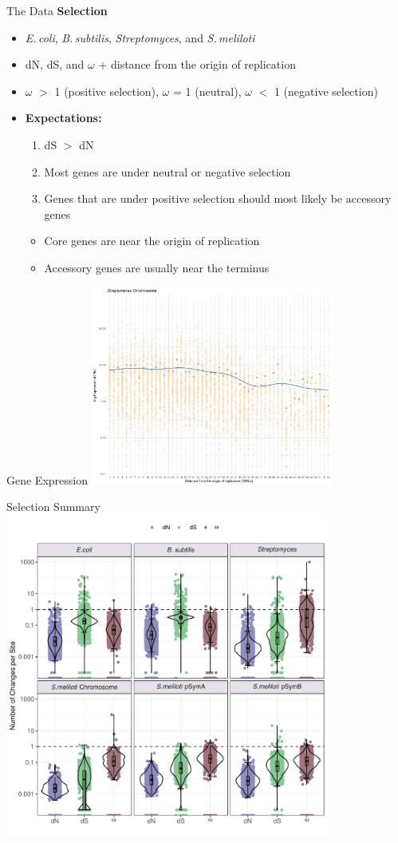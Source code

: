 \documentclass{beamer}
\makeatletter
\newcommand{\bi}{\begin{itemize}}
\newcommand{\ei}{\end{itemize}}
\newcommand{\itm}{\item<itm@1->}
\newcommand{\smel}{\textit{S.\,meliloti}\xspace}
\newcommand{\bass}{\textit{B.\,subtilis}\xspace}
\newcommand{\strep}{\textit{Streptomyces}\xspace}
\newcommand{\ecol}{\textit{E.\,coli}\xspace}
\makeatother
\begin{document}
\begin{frame}[t]{The Data}
			\textbf{Selection}
			\bi
			\itm \ecol, \bass, \strep, and \smel
			\itm dN, dS, and $\omega$ $+$ distance from the origin of replication
			\itm $\omega$ $>$ 1 (positive selection), $\omega$ = 1 (neutral), $\omega$ $<$ 1 (negative selection)
			\itm \textbf{Expectations:} 
			\begin{enumerate}
				\item dS $>$ dN
				\item Most genes are under neutral or negative selection
				\item Genes that are under positive selection should most likely be accessory genes
			\end{enumerate}
			\bi
			\itm Core genes are near the origin of replication
			\itm Accessory genes are usually near the terminus
			\ei
			\ei
\end{frame}
\begin{frame}{Gene Expression}
	\centering
	\includegraphics[width=0.6\textwidth]{strep_expression_plot.pdf}
\end{frame}
\begin{frame}{Selection Summary}
	\centering
	\includegraphics[width=0.8\textwidth]{selection_vio_box.pdf}
\end{frame}
\end{document}
